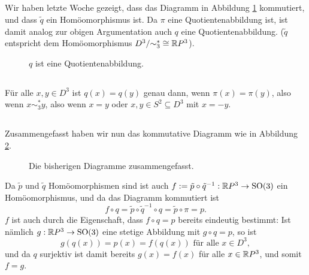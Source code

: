 \documentclass[a4paper,10pt]{article}
\begin{document}
\subsection{}
Wir haben letzte Woche gezeigt, dass das Diagramm in Abbildung \ref{fig: q Quotientenabbildung} kommutiert, und dass $\tilde{q}$ ein Homöomorphismus ist. Da $\pi$ eine Quotientenabbildung ist, ist damit analog zur obigen Argumentation auch $q$ eine Quotientenabbildung. ($\tilde{q}$ entspricht dem Homöomorphismus $D^3/{\sim^*_3} \cong \mathbb{R} P^3$).
\begin{figure}\centering
 \caption{$q$ ist eine Quotientenabbildung.}
 \label{fig: q Quotientenabbildung}
\end{figure}


\subsection{}
Für alle $x,y \in D^3$ ist $q(x) = q(y)$ genau dann, wenn $\pi(x) = \pi(y)$, also wenn $x \sim^*_3 y$, also wenn $x = y$ oder $x,y \in S^2 \subseteq D^3$ mit $x = -y$.


\subsection{}
Zusammengefasst haben wir nun das kommutative Diagramm wie in Abbildung \ref{fig: alles zusammen}.
\begin{figure}\centering
 \caption{Die bisherigen Diagramme zusammengefasst.}
 \label{fig: alles zusammen}
\end{figure}
Da $\tilde{p}$ und $\tilde{q}$ Homöomorphismen sind ist auch $f := \tilde{p} \circ \tilde{q}^{-1} : \mathbb{R} P^3 \to \operatorname{SO}(3)$ ein Homöomorphismus, und da das Diagramm kommutiert ist
\[
 f \circ q
 = \tilde{p} \circ \tilde{q}^{-1} \circ q
 = \tilde{p} \circ \pi
 = p.
\]
$f$ ist auch durch die Eigenschaft, dass $f \circ q = p$ bereits eindeutig bestimmt: Ist nämlich $g : \mathbb{R} P^3 \to \operatorname{SO}(3)$ eine stetige Abbildung mit $g \circ q = p$, so ist
\[
 g(q(x)) = p(x) = f(q(x)) \text{ für alle } x \in D^3,
\]
und da $q$ surjektiv ist damit bereits $g(x) = f(x)$ für alle $x \in \mathbb{R} P^3$, und somit $f = g$.
\end{document}
